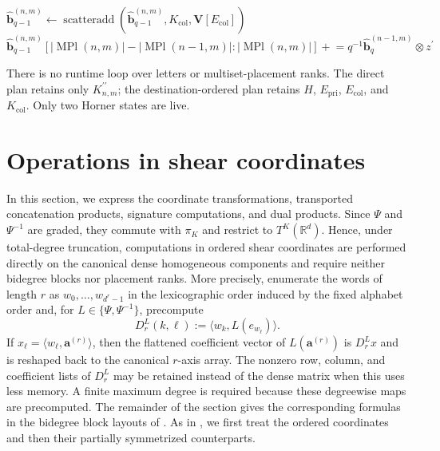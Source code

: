 \documentclass{amsart}
\theoremstyle{definition}
\theoremstyle{remark}
\begin{document}
\begin{implrmk}
\begin{algorithmic}[1]
        \State $\widehat{\mathbf{b}}_{q-1}^{(n,m)}
        \gets
        \operatorname{scatteradd}
        (\widehat{\mathbf{b}}_{q-1}^{(n,m)},
        K_{\mathrm{col}},\mathbf{V}[E_{\mathrm{col}}])$
    \EndIf
\EndIf
{}
    \State $\widehat{\mathbf{b}}_{q-1}^{(n,m)}
        [|\operatorname{MPl}(n,m)|-|\operatorname{MPl}(n-1,m)|:
        |\operatorname{MPl}(n,m)|]
        \mathrel{+}=
        q^{-1}\widehat{\mathbf{b}}_{q}^{(n-1,m)}
        \otimes z^{\prime}$
\EndIf
\end{algorithmic}
There is no runtime loop over letters or multiset-placement ranks. The
direct plan retains only $K^{\prime\prime}_{n,m}$; the destination-ordered
plan retains $H$, $E_{\mathrm{pri}}$, $E_{\mathrm{col}}$, and
$K_{\mathrm{col}}$. Only two Horner states are live.
\end{implrmk}


\section{Operations in shear coordinates}
\label{sec:shear_coordinate_computation}

In this section, we express the coordinate transformations, transported
concatenation products, signature computations, and dual products. Since
$\Psi$ and $\Psi^{-1}$ are graded, they commute with $\pi_K$ and restrict to
$T^K(\mathbb{R}^d)$. Hence, under total-degree truncation, computations in
ordered shear coordinates are performed directly on the canonical dense
homogeneous components and require neither bidegree blocks nor placement
ranks. More precisely, enumerate the words of length $r$ as
$w_0,\ldots,w_{d^r-1}$ in the lexicographic order induced by the fixed
alphabet order and, for $L\in\{\Psi,\Psi^{-1}\}$, precompute
\[
    D_r^L(k,\ell)
    :=
    \big\langle
        w_k,
        L(e_{w_\ell})
    \big\rangle.
\]
If $x_\ell=\langle w_\ell,\mathbf{a}^{(r)}\rangle$, then the flattened
coefficient vector of $L(\mathbf{a}^{(r)})$ is $D_r^Lx$ and is reshaped
back to the canonical $r$-axis array. The nonzero row, column, and
coefficient lists of $D_r^L$ may be retained instead of the dense matrix
when this uses less memory. A finite maximum degree is required because
these degreewise maps are precomputed. The remainder of the section gives
the corresponding formulas in the bidegree block layouts of
. As in
, we first treat the ordered
coordinates and then their partially symmetrized counterparts.
\end{document}
